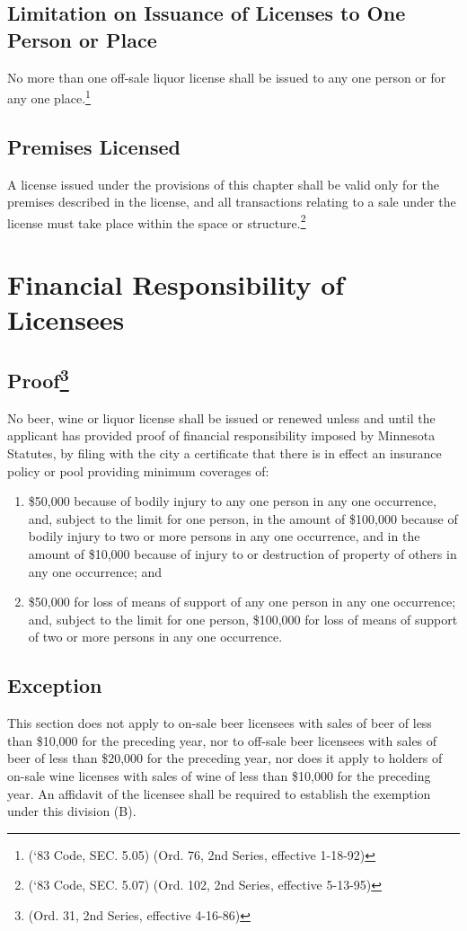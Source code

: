 \subsection{Limitation on Issuance of Licenses to One Person or Place}
No more than one off-sale liquor license shall be issued to any one person or for any one place.\footnote{(‘83 Code, SEC. 5.05)  (Ord. 76, 2nd Series, effective 1-18-92)}
\subsection{Premises Licensed}
A license issued under the provisions of this chapter shall be valid only for the premises described in the license, and all transactions relating to a sale under the license must take place within the space or structure.\footnote{(‘83 Code, SEC. 5.07)  (Ord. 102, 2nd Series, effective 5-13-95)}

\section{Financial Responsibility of Licensees}
\subsection{Proof\footnote{(Ord. 31, 2nd Series, effective 4-16-86)}}
No beer, wine or liquor license shall be issued or renewed unless and until the applicant has provided proof of financial responsibility imposed by Minnesota Statutes, by filing with the city a certificate that there is in effect an insurance policy or pool providing minimum coverages of:
\begin{enumerate}[{\indent}1)]
    \item \$50,000 because of bodily injury to any one person in any one occurrence, and, subject to the limit for one person, in the amount of \$100,000 because of bodily injury to two or more persons in any one occurrence, and in the amount of \$10,000 because of injury to or destruction of property of others in any one occurrence; and 
    \item \$50,000 for loss of means of support of any one person in any one occurrence; and, subject to the limit for one person, \$100,000 for loss of means of support of two or more persons in any one occurrence.
\end{enumerate}
\subsection{Exception}
This section does not apply to on-sale beer licensees with sales of beer of less than \$10,000 for the preceding year, nor to off-sale beer licensees with sales of beer of less than \$20,000 for the preceding year, nor does it apply to holders of on-sale wine licenses with sales of wine of less than \$10,000 for the preceding year.  An affidavit of the licensee shall be required to establish the exemption under this division (B).
